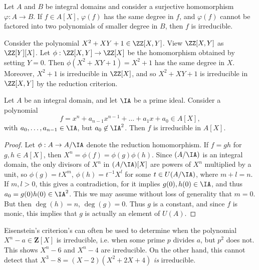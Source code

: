 \begin{theorem}
    Let $A$ and $B$ be integral domains and consider a surjective homomorphism $\varphi: A \to B$. If $f \in A[X]$, $\varphi(f)$ has the same degree in $f$, and $\varphi(f)$ cannot be factored into two polynomials of smaller degree in $B$, then $f$ is irreducible.
\end{theorem}

\begin{example}
    Consider the polynomial $X^2 + XY + 1 \in \ZZ[X,Y]$. View $\ZZ[X,Y]$ as $\ZZ[Y][X]$. Let $\phi: \ZZ[X,Y] \to \ZZ[X]$ be the homomorphism obtained by setting $Y = 0$. Then $\phi(X^2 + XY + 1) = X^2 + 1$ has the same degree in $X$. Moreover, $X^2 + 1$ is irreducible in $\ZZ[X]$, and so $X^2 + XY + 1$ is irreducible in $\ZZ[X,Y]$ by the reduction criterion.
\end{example}

\begin{theorem}[Eisenstein]
    Let $A$ be an integral domain, and let $\IA$ be a prime ideal. Consider a polynomial
    \[ f = x^n + a_{n-1}x^{n-1} + \dots + a_1x + a_0 \in A[X], \]
    with $a_0,\dots,a_{n-1} \in \IA$, but $a_0 \not \in \IA^2$. Then $f$ is irreducible in $A[X]$.
\end{theorem}
\begin{proof}
    Let $\phi: A \to A / \IA$ denote the reduction homomorphism. If $f = gh$ for $g,h \in A[X]$, then $X^n = \phi(f) = \phi(g) \phi(h)$. Since $(A/\IA)$ is an integral domain, the only divisors of $X^n$ in $(A/\IA)[X]$ are powers of $X^n$ multiplied by a unit, so $\phi(g) = t X^m$, $\phi(h) = t^{-1} X^l$ for some $t \in U(A/\IA)$, where $m + l = n$. If $m,l > 0$, this gives a contradiction, for it implies $g(0),h(0) \in \IA$, and thus $a_0 = g(0)h(0) \in \IA^2$. This we may assume without loss of generality that $m = 0$. But then $\deg(h) = n$, $\deg(g) = 0$. Thus $g$ is a constant, and since $f$ is monic, this implies that $g$ is actually an element of $U(A)$.
\end{proof}

\begin{example}
    Eisenstein's criterion's can often be used to determine when the polynomial $X^n - a \in \mathbf{Z}[X]$ is irreducible, i.e. when some prime $p$ divides $a$, but $p^2$ does not. This shows $X^n - 6$ and $X^n - 4$ are irreducible. On the other hand, this cannot detect that $X^3 - 8 = (X - 2)(X^2 + 2X + 4)$ {\it is} irreducible.
\end{example}

